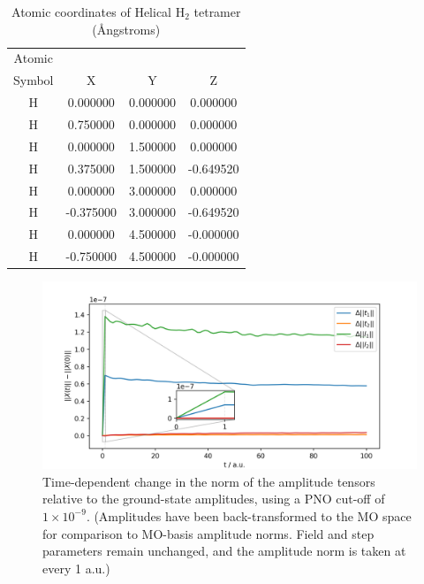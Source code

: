 \newpage
\begin{table}
    \centering
    \caption{Atomic coordinates of Helical H$_2$ tetramer
 (\AA ngstroms)}
    \label{h2_4}
    \begin{tabular}{ c c c c }
    \hline
    \hline
    Atomic & & & \\
    Symbol & X & Y & Z \\
    \hline
	H &   0.000000 &   0.000000 &   0.000000 \\
	H &   0.750000 &   0.000000 &   0.000000 \\
	H &   0.000000 &   1.500000 &   0.000000 \\
	H &   0.375000 &   1.500000 &  -0.649520 \\
	H &   0.000000 &   3.000000 &   0.000000 \\
	H &  -0.375000 &   3.000000 &  -0.649520 \\
	H &   0.000000 &   4.500000 &  -0.000000 \\
	H &  -0.750000 &   4.500000 &  -0.000000 \\
    \hline
    \hline
    \end{tabular}
\end{table}
\newpage
\begin{figure}
\centering
    \includegraphics[scale=0.6]{p3/figures/si/pno_norm.png}
    \caption{Time-dependent change in the norm of the amplitude
    tensors relative to the ground-state amplitudes, using a PNO
    cut-off of $1\times10^{-9}$. (Amplitudes have been 
    back-transformed to the MO space for comparison to MO-basis
    amplitude norms. Field and step parameters remain unchanged,
    and the amplitude norm is taken at every 1 a.u.)}
    \label{fig:si:pno_norm}
\end{figure}

